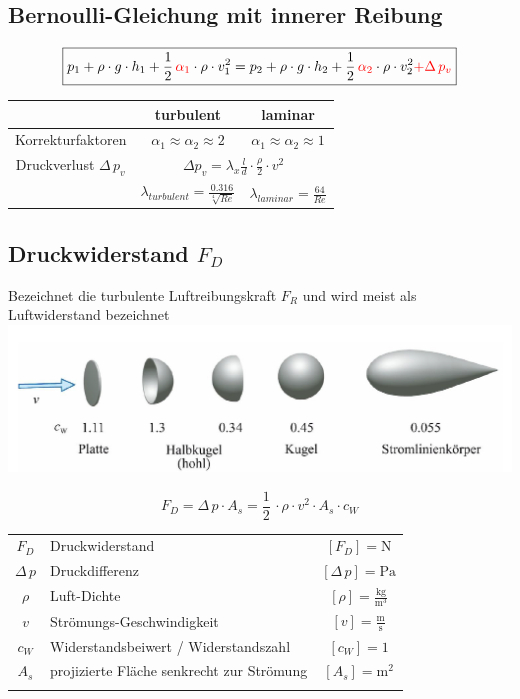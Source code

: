



\subsection{Bernoulli-Gleichung mit innerer Reibung}

$$ \boxed{  p_1 +  \rho \cdot g \cdot h_1 + \frac{1}{2} \, \textcolor{red}{\alpha_1} \cdot \rho \cdot v_1^2 = p_2 +  \rho \cdot g \cdot h_2 + \frac{1}{2} \, \textcolor{red}{\alpha_2} \cdot \rho \cdot v_2^2 \textcolor{red}{+ \Delta \, p_v}  }$$

\begin{tabular}{c| c |c}
 & turbulent & laminar \\ 
\hline 
Korrekturfaktoren & $\alpha_1 \approx \alpha_2 \approx 2$  & $\alpha_1 \approx \alpha_2 \approx 1$ \\ 
\hline 
\rule{0pt}{11pt} Druckverlust $\Delta \, p_v$ & \multicolumn{2}{c}{$\Delta p_v = \lambda_x \frac{l}{d} \cdot \frac{\rho}{2} \cdot v^2$} \\ 
\hline 
\rule{0pt}{11pt}  & $\lambda_{turbulent} = \frac{0.316}{\sqrt[4]{Re}}  $ & $\lambda_{laminar} = \frac{64}{Re} $  \\ 
\end{tabular} 



\subsection{Druckwiderstand $F_D$}
Bezeichnet die turbulente Luftreibungskraft $F_R$ und wird meist als Luftwiderstand bezeichnet \\

\includegraphics[width=0.8\linewidth]{Bilder/widerstandsbeiwert.png}

$$ \boxed{ F_D = \Delta \, p \cdot A_s = \frac{1}{2} \, \cdot \rho \cdot v^2 \cdot A_s \cdot c_W } $$


\begin{tabular}{c l c}
		$F_D$ & Druckwiderstand & $[F_D] = \mathrm{N}$ \\
		$\Delta \, p$ & Druckdifferenz & $[\Delta \, p] = \mathrm{Pa}$  \\
		\rule{0pt}{8pt}$\rho$ & Luft-Dichte & $[\rho] = \mathrm{\frac{kg}{m^3}}$ \\
		\rule{0pt}{8pt}$v$ & Strömungs-Geschwindigkeit & $[v] = \mathrm{\frac{m}{s}}$ \\
		$c_W$ & Widerstandsbeiwert / Widerstandszahl & $[c_W] = 1$\\
		$A_s$ & projizierte Fläche senkrecht zur Strömung & $[A_s] = \mathrm{m^2}$ \\
		\\
\end{tabular}

